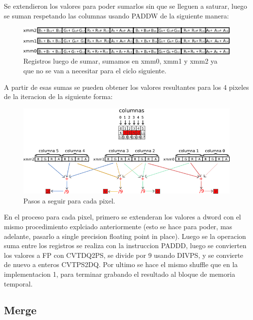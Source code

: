\documentclass[a4paper]{article}
\begin{document}
Se extendieron los valores para poder sumarlos sin que se lleguen a saturar, luego se suman respetando las columnas usando PADDW de la siguiente manera:

\begin{figure}[H]
\centering
\includegraphics[scale=0.8]{imagenes/blur2add.png}
\caption{Registros luego de sumar, sumamos en xmm0, xmm1 y xmm2 ya que no se van a necesitar para el ciclo siguiente.}
\label{b2unpack}
\end{figure}

A partir de esas sumas se pueden obtener los valores resultantes para los 4 pixeles de la iteracion de la siguiente forma:

\begin{figure}[H]
\centering
\includegraphics[scale=0.8]{imagenes/blur2end.png}
\caption{Pasos a seguir para cada pixel.}
\label{b2endprocess}
\end{figure}

En el proceso para cada pixel, primero se extenderan los valores a dword con el mismo procedimiento explciado anteriormente (esto se hace para poder, mas adelante, pasarlo a single precision floating point in place). Luego se la operacion suma entre los registros se realiza con la instruccion PADDD, luego se convierten los valores a FP con CVTDQ2PS, se divide por 9 usando DIVPS, y se convierte de nuevo a enteros CVTPS2DQ. Por ultimo se hace el mismo shuffle que en la implementacion 1, para terminar grabando el resultado al bloque de memoria temporal.

\newpage

\subsection{Merge}
\end{document}
